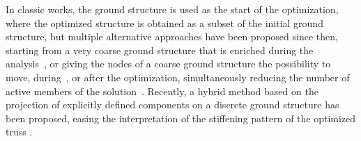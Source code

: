 In classic works, the ground structure is used as the start of the optimization, where the optimized structure is obtained as a subset of the initial ground structure, but multiple alternative approaches have been proposed since then, \eg starting from a very coarse ground structure that is enriched during the analysis~, or giving the nodes of a coarse ground structure the possibility to move, during~, or after the optimization, simultaneously reducing the number of active members of the solution~. Recently, a hybrid method based on the projection of explicitly defined components on a discrete ground structure has been proposed, easing the interpretation of the stiffening pattern of the optimized truss .

